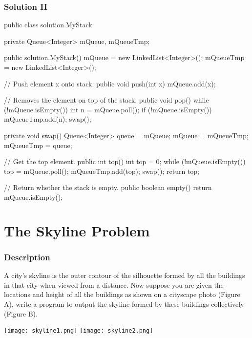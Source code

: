 \newpage

\subsubsection{Solution II}

\begin{Code}
public class solution.MyStack {

    private Queue<Integer> mQueue, mQueueTmp;

    public solution.MyStack() {
        mQueue = new LinkedList<Integer>();
        mQueueTmp = new LinkedList<Integer>();
    }

    // Push element x onto stack.
    public void push(int x) {
        mQueue.add(x);
    }

    // Removes the element on top of the stack.
    public void pop() {
        while (!mQueue.isEmpty()) {
            int n = mQueue.poll();
            if (!mQueue.isEmpty()) {
                mQueueTmp.add(n);
            }
        }
        swap();
    }

    private void swap() {
        Queue<Integer> queue = mQueue;
        mQueue = mQueueTmp;
        mQueueTmp = queue;
    }

    // Get the top element.
    public int top() {
        int top = 0;
        while (!mQueue.isEmpty()) {
            top = mQueue.poll();
            mQueueTmp.add(top);
        }
        swap();
        return top;
    }

    // Return whether the stack is empty.
    public boolean empty() {
        return mQueue.isEmpty();
    }
}
\end{Code}

\newpage

\section{The Skyline Problem} %

\subsubsection{Description}
A city's skyline is the outer contour of the silhouette formed by all the buildings in that city when viewed from a distance. Now suppose you are given the locations and height of all the buildings as shown on a cityscape photo (Figure A), write a program to output the skyline formed by these buildings collectively (Figure B).

\begin{center}
\texttt{[image: skyline1.png]}
\texttt{[image: skyline2.png]}
\end{center}

